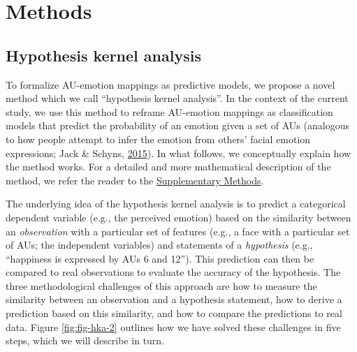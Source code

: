 \documentclass[12pt,american,a4paper,oneside,]{memoir} %
\begin{document}
\hypertarget{hka-methods}{%
\section{Methods}\label{hka-methods}}

\hypertarget{hypothesis-kernel-analysis-1}{%
\subsection{Hypothesis kernel analysis}\label{hypothesis-kernel-analysis-1}}

To formalize AU-emotion mappings as predictive models, we propose a novel method which we call ``hypothesis kernel analysis''. In the context of the current study, we use this method to reframe AU-emotion mappings as classification models that predict the probability of an emotion given a set of AUs (analogous to how people attempt to infer the emotion from others' facial emotion expressions; Jack \& Schyns, \protect\hyperlink{ref-Jack2015-sh}{2015}). In what follows, we conceptually explain how the method works. For a detailed and more mathematical description of the method, we refer the reader to the \protect\hyperlink{hypothesis-kernel-analysis-supplement}{Supplementary Methods}.

The underlying idea of the hypothesis kernel analysis is to predict a categorical dependent variable (e.g., the perceived emotion) based on the similarity between an \emph{observation} with a particular set of features (e.g., a face with a particular set of AUs; the independent variables) and statements of a \emph{hypothesis} (e.g., ``happiness is expressed by AUs 6 and 12''). This prediction can then be compared to real observations to evaluate the accuracy of the hypothesis. The three methodological challenges of this approach are how to measure the similarity between an observation and a hypothesis statement, how to derive a prediction based on this similarity, and how to compare the predictions to real data. Figure \ref{fig:fig-hka-2} outlines how we have solved these challenges in five steps, which we will describe in turn.
\end{document}
